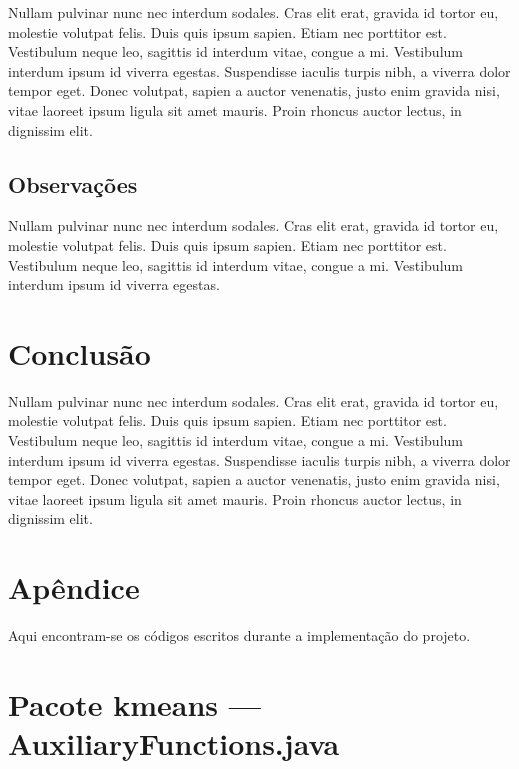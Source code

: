 \documentclass[10pt,twocolumn,letterpaper]{article}
\begin{document}
Nullam pulvinar nunc nec interdum sodales. Cras elit erat, gravida id tortor eu, molestie volutpat felis. Duis quis ipsum sapien. Etiam nec porttitor est. Vestibulum neque leo, sagittis id interdum vitae, congue a mi. Vestibulum interdum ipsum id viverra egestas. Suspendisse iaculis turpis nibh, a viverra dolor tempor eget. Donec volutpat, sapien a auctor venenatis, justo enim gravida nisi, vitae laoreet ipsum ligula sit amet mauris. Proin rhoncus auctor lectus, in dignissim elit.

\subsection{Observações}
Nullam pulvinar nunc nec interdum sodales. Cras elit erat, gravida id tortor eu, molestie volutpat felis. Duis quis ipsum sapien. Etiam nec porttitor est. Vestibulum neque leo, sagittis id interdum vitae, congue a mi. Vestibulum interdum ipsum id viverra egestas.

\section{Conclusão}

Nullam pulvinar nunc nec interdum sodales. Cras elit erat, gravida id tortor eu, molestie volutpat felis. Duis quis ipsum sapien. Etiam nec porttitor est. Vestibulum neque leo, sagittis id interdum vitae, congue a mi. Vestibulum interdum ipsum id viverra egestas. Suspendisse iaculis turpis nibh, a viverra dolor tempor eget. Donec volutpat, sapien a auctor venenatis, justo enim gravida nisi, vitae laoreet ipsum ligula sit amet mauris. Proin rhoncus auctor lectus, in dignissim elit.

{\small


}

\newpage
\onecolumn
   
\section*{Apêndice}
Aqui encontram-se os códigos escritos durante a implementação do projeto.
\section*{Pacote kmeans --- AuxiliaryFunctions.java}
\end{document}
